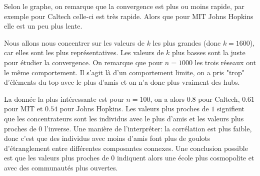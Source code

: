 \documentclass{article}
\begin{document}
Selon le graphe, on remarque que la convergence est plus ou moins rapide, par exemple pour Caltech celle-ci est très rapide.
Alors que pour MIT Johns Hopkins elle est un peu plus lente.

Nous allons nous concentrer sur les valeurs de $k$ les plus grandes (donc $k = 1600$), car elles sont les plus représentatives. Les valeurs de $k$ plus basses sont la juste pour étudier la convergence.
On remarque que pour $n = 1000$ les trois réseaux ont le même comportement. Il s'agit là d'un comportement limite, on a pris "trop" d'éléments du top avec le plus d'amis et on n'a donc plus vraiment des hubs.

La donnée la plus intéressante est pour $n = 100$, on a alors $0.8$ pour Caltech, $0.61$ pour MIT et $0.54$ pour Johns Hopkins. Les valeurs plus proches de $1$ signifient que les concentrateurs sont les individus avec le plus d'amis et les valeurs plus proches de $0$ l'inverse.
Une manière de l'interpréter: la corrélation est plus faible, donc c'est que des individus avec moins d'amis font plus de goulots d'étranglement entre différentes composantes connexes.
Une conclusion possible est que les valeurs plus proches de $0$ indiquent alors une école plus cosmopolite et avec des communautés plus ouvertes.
\end{document}
